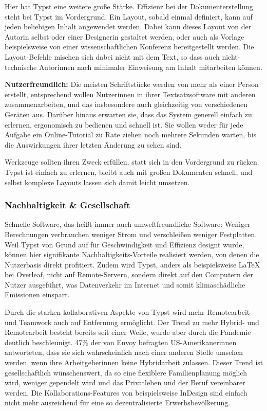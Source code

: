 \documentclass[11pt, a4paper]{article}
\newcommand{\gender}{\raisebox{-.25em}{*}}
\newcommand{\cited}[1]{\marginsymbol{\textbf{↗} #1}}
\newcommand{\marginsymbol}[1] {\protect\marginsymbolhelper{#1}}
\newcommand{\marginsymbolhelper}[1] {\tabto*{-1cm}\makebox[0cm]{#1}\tabto*{\TabPrevPos}}
\begin{document}
Hier hat Typst eine weitere große Stärke. Effizienz bei der Dokumenterstellung steht bei Typst im Vordergrund. Ein Layout, sobald einmal definiert, kann auf jeden beliebigen Inhalt angewendet werden. Dabei kann dieses Layout von der\gender{} Autor\gender{}in selbst oder einer\gender{} Designer\gender{}in gestaltet werden, oder auch als Vorlage beispielsweise von einer wissenschaftlichen Konferenz bereitgestellt werden. Die Layout-Befehle mischen sich dabei nicht mit dem Text, so dass auch nicht-technische Autor\gender{}innen nach minimaler Einweisung am Inhalt mitarbeiten können.

\textbf{Nutzerfreundlich:} Die meisten Schriftstücke werden von mehr als einer Person erstellt, entsprechend wollen Nutzer\gender{}innen in ihrer Textsatzsoftware mit anderen zusammenarbeiten, und das insbesondere auch gleichzeitig von verschiedenen Geräten aus. Darüber hinaus erwarten sie, dass das System generell einfach zu erlernen, ergonomisch zu bedienen und schnell ist. Sie wollen weder für jede Aufgabe ein Online-Tutorial zu Rate ziehen noch mehrere Sekunden warten, bis die Auswirkungen ihrer letzten Änderung zu sehen sind.

Werkzeuge sollten ihren Zweck erfüllen, statt sich in den Vordergrund zu rücken. Typst ist einfach zu erlernen, bleibt auch mit großen Dokumenten schnell, und selbst komplexe Layouts lassen sich damit leicht umsetzen.

\subsubsection*{Nachhaltigkeit \& Gesellschaft}

Schnelle Software, das heißt immer auch umweltfreundliche Software: Weniger Berechnungen verbrauchen weniger Strom und verschleißen weniger Festplatten. Weil Typst von Grund auf für Geschwindigkeit und Effizienz designt wurde, können hier signifikante Nachhaltigkeits-Vorteile realisiert werden, von denen die Nutzerbasis direkt profitiert. Zudem wird Typst, anders als beispielsweise LaTeX bei Overleaf,  nicht auf Remote-Servern, sondern direkt auf den Computern der Nutzer ausgeführt, was Datenverkehr im Internet und somit klimaschädliche Emissionen einspart.


Durch die starken kollaborativen Aspekte von Typst wird mehr Remotearbeit und Teamwork auch auf Entfernung ermöglicht. Der Trend zu mehr \cited{2} Hybrid- und Remotearbeit besteht bereits seit einer Weile, wurde aber durch die Pandemie deutlich beschleunigt. \cited{3} 47\% der von Envoy befragten US-Amerikaner\gender{}innen antworteten, dass sie sich wahrscheinlich nach einer anderen Stelle umsehen werden, wenn ihr\gender{}e Arbeitgeber\gender{}innen keine Hybridarbeit zulassen. Dieser Trend ist gesellschaftlich wünschenswert, da so eine flexiblere Familienplanung möglich wird, weniger gependelt wird und das Privatleben und der Beruf vereinbarer werden. Die Kollaborations-Features von beispielsweise InDesign sind einfach nicht mehr ausreichend für eine so dezentralisierte Erwerbsbevölkerung.
\end{document}
